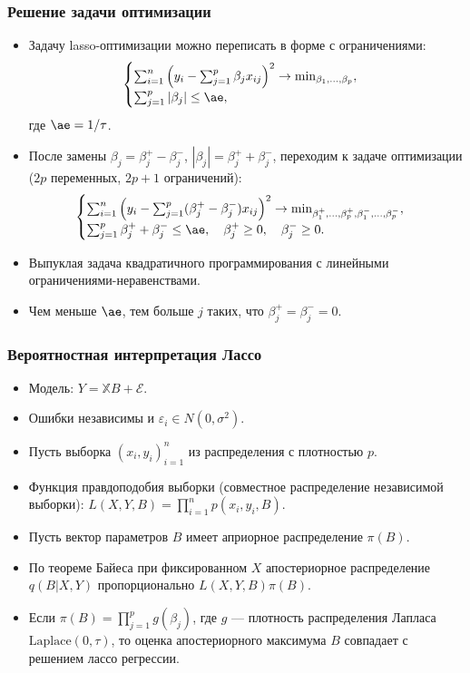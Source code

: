 \documentclass[10pt,unicode, notheorems]{beamer}
\begin{document}
\begin{frame}
\frametitle{Решение задачи оптимизации}
\begin{itemize}
\item Задачу lasso-оптимизации можно переписать в форме с ограничениями: %
\begin{equation*}
\begin{cases}
\sum_{i=1}^{n}
\left(
y_{i}
-
\sum_{j=1}^{p}\beta_{j}x_{ij}
\right)^{2}
\to
\min_{\beta_{1},\ldots,\beta_{p}},\\
\sum_{j=1}^{p}|\beta_{j}|\leq\ae,
\end{cases}
\end{equation*}
где $\ae=1/\tau$.
\item После замены $\beta_{j}=\beta_{j}^{+}-\beta_{j}^{-}$, $|\beta_{j}|=\beta_{j}^{+}+\beta_{j}^{-}$, переходим к задаче оптимизации ($2p$ переменных, $2p+1$ ограничений):
\begin{equation*}
\begin{cases}
\sum_{i=1}^{n}
\left(
y_{i}
-
\sum_{j=1}^{p}(\beta_{j}^{+}-\beta_{j}^{-})x_{ij}
\right)^{2}
\to
\min_{\beta_{1}^{+},\ldots,\beta_{p}^{+},\beta_{1}^{-},\ldots,\beta_{p}^{-}},\\
\sum_{j=1}^{p}\beta_{j}^{+}+\beta_{j}^{-}\leq\ae,
\quad
\beta_{j}^{+}\geq 0,
\quad
\beta_{j}^{-}\geq 0.
\end{cases}
\end{equation*}
\item Выпуклая задача квадратичного программирования с линейными ограничениями-неравенствами.
\item Чем меньше $\ae$, тем больше $j$ таких, что  $\beta_{j}^{+}=\beta_{j}^{-}=0$.
\end{itemize}
\end{frame}



\begin{frame}
\frametitle{Вероятностная интерпретация Лассо}

\begin{itemize}
\item Модель: $Y=\mathbb{X}B+\mathcal{E}$.
\item Ошибки независимы и $\varepsilon_{i}\in N(0,\sigma^{2})$.
\item Пусть выборка $(x_{i},y_{i})_{i=1}^{n}$ из распределения с плотностью $p$.
\item Функция правдоподобия выборки (совместное распределение независимой выборки): $L(X,Y,B)=\prod_{i=1}^{n}p(x_{i},y_{i},B)$.
\item Пусть вектор параметров $B$ имеет априорное распределение $\pi(B)$.
\item По теореме Байеса при фиксированном $X$ апостериорное распределение $q(B|X,Y)$ пропорционально $L(X,Y,B)\pi(B)$.
\item Если $\pi(B)=\prod_{j=1}^{p}g(\beta_{j})$, где $g$ --- плотность распределения Лапласа $\mathrm{Laplace}(0,\tau)$, то оценка апостериорного максимума $B$ совпадает с решением лассо регрессии.
\end{itemize}
\end{frame} 
\end{document}
